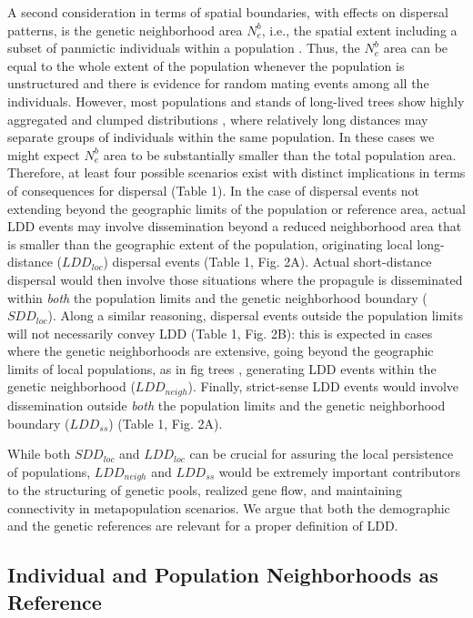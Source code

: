 \documentclass[a4paper, 12pt]{article}
\begin{document}
\begin{linenumbers}
A second consideration in terms of spatial boundaries, with effects on dispersal patterns, is the genetic neighborhood area $N^b_e$, i.e., the spatial extent including a subset of panmictic individuals within a population \citep{Wright:1943aa,Wright:1946aa}. Thus, the $N^b_e$ area can be equal to the whole extent of the population whenever the population is unstructured and there is evidence for random mating events among all the individuals. However, most populations and stands of long-lived trees show highly aggregated and clumped distributions \citep{Seidler:2006hx}, where relatively long distances may separate groups of individuals within the same population. In these cases we might expect $N^b_e$ area to be substantially smaller than the total population area. Therefore, at least four possible scenarios exist with distinct implications in terms of consequences for dispersal (Table 1). In the case of dispersal events not extending beyond the geographic limits of the population or reference area, actual LDD events may involve dissemination beyond a reduced neighborhood area that is smaller than the geographic extent of the population, originating local long-distance ($LDD_{loc}$) dispersal events (Table 1, Fig. 2A). Actual short-distance dispersal would then involve those situations where the propagule is disseminated within \textit{both} the population limits and the genetic neighborhood boundary ($SDD_{loc}$). Along a similar reasoning, dispersal events outside the population limits will not necessarily convey LDD (Table 1, Fig. 2B): this is expected in cases where the genetic neighborhoods are extensive, going beyond the geographic limits of local populations, as in fig trees \citep{Nason:1998aa}, generating LDD events within the genetic neighborhood ($LDD_{neigh}$). Finally, strict-sense LDD events would involve dissemination outside \textit{both} the population limits and the genetic neighborhood boundary ($LDD_{ss}$) (Table 1, Fig. 2A).

While both $SDD_{loc}$ and $LDD_{loc}$ can be crucial for assuring the local persistence of populations, $LDD_{neigh}$ and $LDD_{ss}$ would be extremely important contributors to the structuring of genetic pools, realized gene flow, and maintaining connectivity in metapopulation scenarios. We argue that both the demographic and the genetic references are relevant for a proper definition of LDD.
 


\subsection*{Individual and Population Neighborhoods as Reference}


\end{linenumbers}
\end{document}
